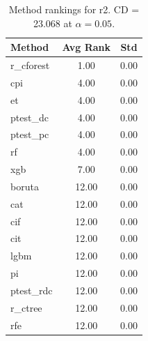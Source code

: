 \begin{table}[h]
\centering
\caption{Method rankings for r2. CD = 23.068 at $\alpha=0.05$.}
\label{tab:ranks_r2}
\begin{tabular}{lcc}
\toprule
Method & Avg Rank & Std \\
\midrule
r_cforest & 1.00 & 0.00 \\
cpi & 4.00 & 0.00 \\
et & 4.00 & 0.00 \\
ptest_dc & 4.00 & 0.00 \\
ptest_pc & 4.00 & 0.00 \\
rf & 4.00 & 0.00 \\
xgb & 7.00 & 0.00 \\
boruta & 12.00 & 0.00 \\
cat & 12.00 & 0.00 \\
cif & 12.00 & 0.00 \\
cit & 12.00 & 0.00 \\
lgbm & 12.00 & 0.00 \\
pi & 12.00 & 0.00 \\
ptest_rdc & 12.00 & 0.00 \\
r_ctree & 12.00 & 0.00 \\
rfe & 12.00 & 0.00 \\
\bottomrule
\end{tabular}
\end{table}